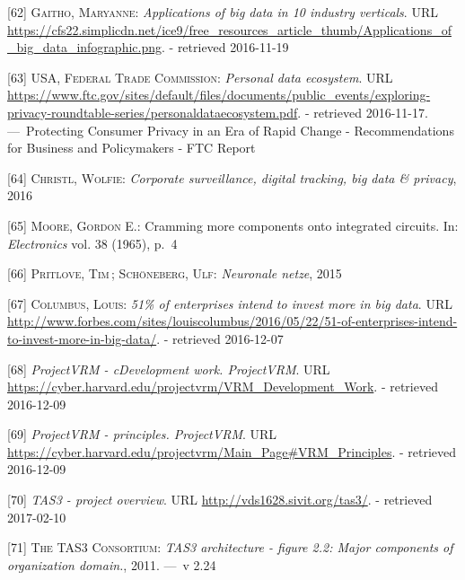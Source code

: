 \documentclass[12pt,english,a4paper,titlepage,cleardoublepage=empty,dottedtoc]{report}
\begin{document}
\hypertarget{ref-graphic_2015_applications-of-big-data-in-10-industry-verticals}{}
{[}62{]} \textsc{Gaitho, Maryanne}: \emph{Applications of big data in 10
industry verticals}. URL
\url{https://cfs22.simplicdn.net/ice9/free_resources_article_thumb/Applications_of_big_data_infographic.png}.
- retrieved 2016-11-19

\hypertarget{ref-graphic_2012_personal-data-ecosystem}{}
{[}63{]} \textsc{USA, Federal Trade Commission}: \emph{Personal data
ecosystem}. URL
\url{https://www.ftc.gov/sites/default/files/documents/public_events/exploring-privacy-roundtable-series/personaldataecosystem.pdf}.
- retrieved 2016-11-17. ---~Protecting Consumer Privacy in an Era of
Rapid Change - Recommendations for Business and Policymakers - FTC
Report

\hypertarget{ref-video_2016_corporate-surveillance-digital-tracking-big-data-privacy}{}
{[}64{]} \textsc{Christl, Wolfie}: \emph{Corporate surveillance, digital
tracking, big data \& privacy}, 2016

\hypertarget{ref-paper_1965_moors-law}{}
{[}65{]} \textsc{Moore, Gordon E.}: Cramming more components onto
integrated circuits. In: \emph{Electronics} vol. 38 (1965), p.~4

\hypertarget{ref-podcast_2015_cre-neuronale-netze}{}
{[}66{]} \textsc{Pritlove, Tim}\,; \textsc{Schöneberg, Ulf}:
\emph{Neuronale netze}, 2015

\hypertarget{ref-web_2016_industries-intention-to-invest-in-big-data}{}
{[}67{]} \textsc{Columbus, Louis}: \emph{51\% of enterprises intend to
invest more in big data}. URL
\url{http://www.forbes.com/sites/louiscolumbus/2016/05/22/51-of-enterprises-intend-to-invest-more-in-big-data/}.
- retrieved 2016-12-07

\hypertarget{ref-web_2016_projectvrm_development-work}{}
{[}68{]} \emph{ProjectVRM - cDevelopment work. ProjectVRM}. URL
\url{https://cyber.harvard.edu/projectvrm/VRM_Development_Work}. -
retrieved 2016-12-09

\hypertarget{ref-web_2016_projectvrm_principles}{}
{[}69{]} \emph{ProjectVRM - principles. ProjectVRM}. URL
\url{https://cyber.harvard.edu/projectvrm/Main_Page\#VRM_Principles}. -
retrieved 2016-12-09

\hypertarget{ref-web_2011_tas3-project}{}
{[}70{]} \emph{TAS3 - project overview}. URL
\url{http://vds1628.sivit.org/tas3/}. - retrieved 2017-02-10

\hypertarget{ref-graphic_2011_architecture_components-of-organization-domain}{}
{[}71{]} \textsc{The TAS3 Consortium}: \emph{TAS3 architecture - figure
2.2: Major components of organization domain.}, 2011. ---~v 2.24
\end{document}
